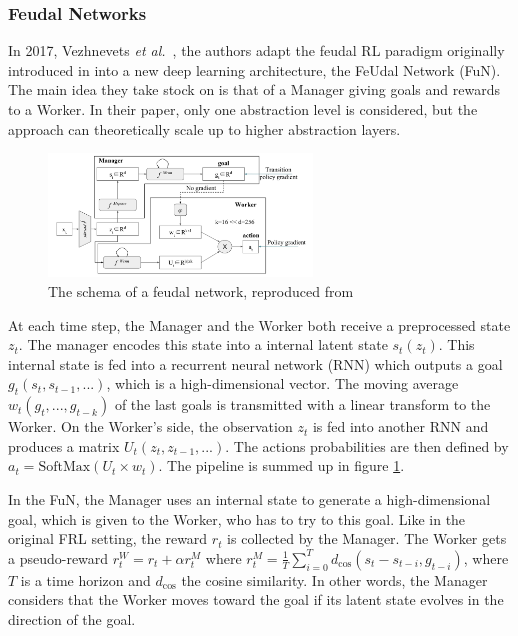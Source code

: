 \documentclass{article}
\newcommand{\etal}{\textit{et al.}}
\begin{document}
\subsubsection{Feudal Networks}

In 2017, Vezhnevets \etal~\cite{vezhnevets_feudal_2017}, the authors adapt the feudal RL paradigm originally introduced in \cite{dayan_feudal_1993} into a new deep learning architecture, the FeUdal Network (FuN). The main idea they take stock on is that of a Manager giving goals and rewards to a Worker. In their paper, only one abstraction level is considered, but the approach can theoretically scale up to higher abstraction layers.

\begin{figure}
    \centering
    \includegraphics[width=7cm]{images/fun.png}
    \caption{The schema of a feudal network, reproduced from \cite{vezhnevets_feudal_2017}}
    \label{fig:fun}
\end{figure}

At each time step, the Manager and the Worker both receive a preprocessed state $z_t$. The manager encodes this state into a internal latent state $s_t(z_t)$. This internal state is fed into a recurrent neural network (RNN) which outputs a goal $g_t(s_t, s_{t-1}, ...)$, which is a high-dimensional vector. The moving average $w_t(g_t, ..., g_{t-k})$ of the last goals is transmitted with a linear transform to the Worker. On the Worker's side, the observation $z_t$ is fed into another RNN and produces a matrix $U_t(z_t, z_{t-1}, ...)$. The actions probabilities are then defined by $a_t = \mathrm{SoftMax}(U_t \times w_t)$. The pipeline is summed up in figure \ref{fig:fun}.

In the FuN, the Manager uses an internal state to generate a high-dimensional goal, which is given to the Worker, who has to try to this goal. Like in the original FRL setting, the reward $r_t$ is collected by the Manager. The Worker gets a pseudo-reward $r^W_t = r_t + \alpha r^M_t$ where $r^M_t = \frac 1T \sum_{i=0}^T d_\mathrm{cos}(s_t-s_{t-i}, g_{t-i})$, where $T$ is a time horizon and $d_\mathrm{cos}$ the cosine similarity. In other words, the Manager considers that the Worker moves toward the goal if its latent state evolves in the direction of the goal.
\end{document}
